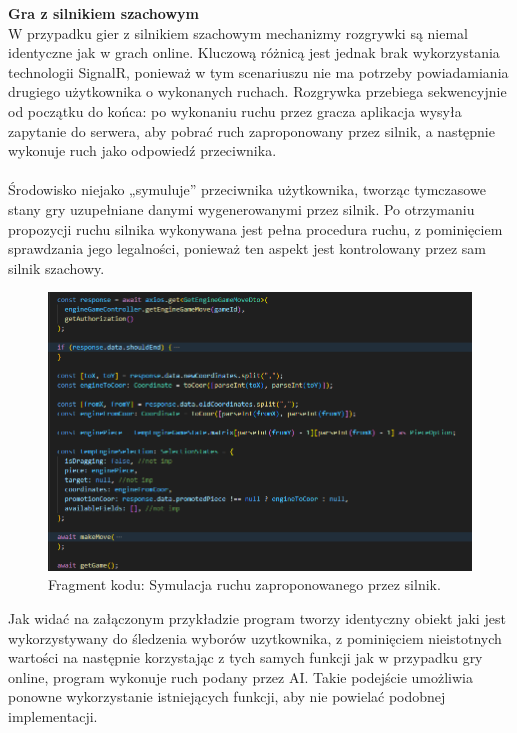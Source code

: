 \documentclass[12pt,a4paper]{article}
\begin{document}
\newpage

\noindent \textbf{Gra z silnikiem szachowym}\\
W przypadku gier z silnikiem szachowym mechanizmy rozgrywki są niemal identyczne jak w grach online. Kluczową różnicą jest jednak brak wykorzystania technologii SignalR, ponieważ w tym scenariuszu nie ma potrzeby powiadamiania drugiego użytkownika o wykonanych ruchach. Rozgrywka przebiega sekwencyjnie od początku do końca: po wykonaniu ruchu przez gracza aplikacja wysyła zapytanie do serwera, aby pobrać ruch zaproponowany przez silnik, a następnie wykonuje ruch jako odpowiedź przeciwnika.
\\\\
Środowisko niejako „symuluje” przeciwnika użytkownika, tworząc tymczasowe stany gry uzupełniane danymi wygenerowanymi przez silnik. Po otrzymaniu propozycji ruchu silnika wykonywana jest pełna procedura ruchu, z pominięciem sprawdzania jego legalności, ponieważ ten aspekt jest kontrolowany przez sam silnik szachowy.

\vspace{1cm}
\begin{figure}[h!]
    \centering
    \includegraphics[width=1\textwidth]{images/ex_engine_move_sim.png}
    \caption{Fragment kodu: Symulacja ruchu zaproponowanego przez silnik.}
\end{figure}

\noindent
Jak widać na załączonym przykładzie program tworzy identyczny obiekt jaki jest wykorzystywany do śledzenia wyborów uzytkownika, z pominięciem nieistotnych wartości na następnie korzystając z tych samych funkcji jak w przypadku gry online, program wykonuje ruch podany przez AI. Takie podejście umożliwia ponowne wykorzystanie istniejących funkcji, aby nie powielać podobnej implementacji.
\end{document}
